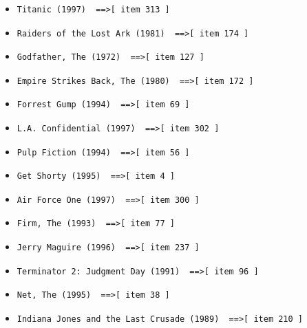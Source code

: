 \documentclass[12pt,a4paper]{article}
\begin{document}
\begin{itemize}
\item \begin{verbatim}Titanic (1997)  ==>[ item 313 ]\end{verbatim}
\item \begin{verbatim}Raiders of the Lost Ark (1981)  ==>[ item 174 ]\end{verbatim}
\item \begin{verbatim}Godfather, The (1972)  ==>[ item 127 ]\end{verbatim}
\item \begin{verbatim}Empire Strikes Back, The (1980)  ==>[ item 172 ]\end{verbatim}
\item \begin{verbatim}Forrest Gump (1994)  ==>[ item 69 ]\end{verbatim}
\item \begin{verbatim}L.A. Confidential (1997)  ==>[ item 302 ]\end{verbatim}
\item \begin{verbatim}Pulp Fiction (1994)  ==>[ item 56 ]\end{verbatim}
\item \begin{verbatim}Get Shorty (1995)  ==>[ item 4 ]\end{verbatim}
\item \begin{verbatim}Air Force One (1997)  ==>[ item 300 ]\end{verbatim}
\item \begin{verbatim}Firm, The (1993)  ==>[ item 77 ]\end{verbatim}
\item \begin{verbatim}Jerry Maguire (1996)  ==>[ item 237 ]\end{verbatim}
\item \begin{verbatim}Terminator 2: Judgment Day (1991)  ==>[ item 96 ]\end{verbatim}
\item \begin{verbatim}Net, The (1995)  ==>[ item 38 ]\end{verbatim}
\item \begin{verbatim}Indiana Jones and the Last Crusade (1989)  ==>[ item 210 ]\end{verbatim}

\end{itemize}
\end{document}
